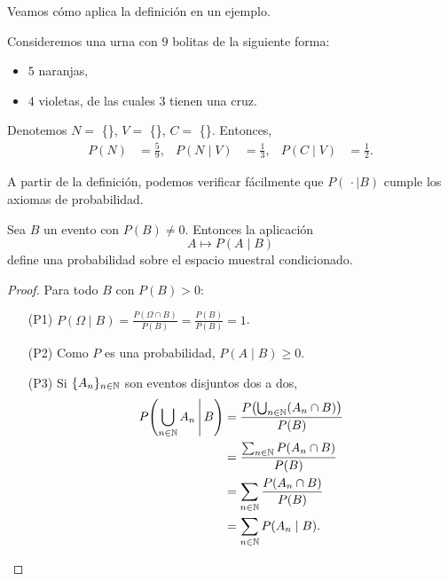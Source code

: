 Veamos cómo aplica la definición en un ejemplo.

\begin{example}
    Consideremos una urna con $9$ bolitas de la siguiente forma:
    \begin{itemize}
        \item $5$ naranjas,
        \item $4$ violetas, de las cuales $3$ tienen una cruz.
    \end{itemize}
    Denotemos $N=$ \{\}, $V=$ \{\}, $C=$ \{\}. Entonces,
    \begin{align*}
        P(N) &= \frac{5}{9}, &
        P(N \mid V) &= \frac{1}{3}, &
        P(C \mid V) &= \frac{1}{2}.
    \end{align*}
\end{example}

A partir de la definición, podemos verificar fácilmente que $P(\,\cdot \mid B)$ cumple los axiomas de probabilidad.

\begin{proposition}
    Sea $B$ un evento con $P(B) \neq 0$. Entonces la aplicación
    \begin{equation*}
        A \mapsto P(A \mid B)
    \end{equation*}
    define una probabilidad sobre el espacio muestral condicionado.
\end{proposition}

\begin{proof}
    Para todo $B$ con $P(B)>0$:
    \begin{itemize}
        \item[(P1)] $P(\Omega \mid B) = \frac{P(\Omega \cap B)}{P(B)} = \frac{P(B)}{P(B)}=1$.
        \item[(P2)] Como $P$ es una probabilidad, $P(A \mid B) \geq 0$.
        \item[(P3)] Si $\{A_n\}_{n \in \mathbb{N}}$ son eventos disjuntos dos a dos,
        \begin{align*}
            P\!\left(\bigcup_{n \in \mathbb{N}} A_n \,\middle|\, B\right)
            &= \frac{P\!\left(\bigcup_{n \in \mathbb{N}}(A_n \cap B)\right)}{P(B)} \\
            &= \frac{\sum_{n \in \mathbb{N}} P(A_n \cap B)}{P(B)} \\
            &= \sum_{n \in \mathbb{N}} \frac{P(A_n \cap B)}{P(B)} \\
            &= \sum_{n \in \mathbb{N}} P(A_n \mid B).
        \end{align*}
    \end{itemize}
\end{proof}

